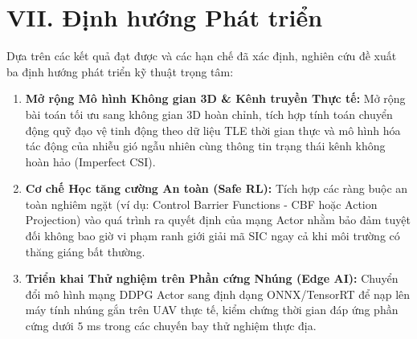 \section*{VII. Định hướng Phát triển}

Dựa trên các kết quả đạt được và các hạn chế đã xác định, nghiên cứu đề xuất ba định hướng phát triển kỹ thuật trọng tâm:
\begin{enumerate}[label=\textbf{\arabic*.}]
    \item \textbf{Mở rộng Mô hình Không gian 3D \& Kênh truyền Thực tế:} Mở rộng bài toán tối ưu sang không gian 3D hoàn chỉnh, tích hợp tính toán chuyển động quỹ đạo vệ tinh động theo dữ liệu TLE thời gian thực và mô hình hóa tác động của nhiễu gió ngẫu nhiên cùng thông tin trạng thái kênh không hoàn hảo (Imperfect CSI).
    \item \textbf{Cơ chế Học tăng cường An toàn (Safe RL):} Tích hợp các ràng buộc an toàn nghiêm ngặt (ví dụ: Control Barrier Functions - CBF hoặc Action Projection) vào quá trình ra quyết định của mạng Actor nhằm bảo đảm tuyệt đối không bao giờ vi phạm ranh giới giải mã SIC ngay cả khi môi trường có thăng giáng bất thường.
    \item \textbf{Triển khai Thử nghiệm trên Phần cứng Nhúng (Edge AI):} Chuyển đổi mô hình mạng DDPG Actor sang định dạng ONNX/TensorRT để nạp lên máy tính nhúng gắn trên UAV thực tế, kiểm chứng thời gian đáp ứng phần cứng dưới $5$ ms trong các chuyến bay thử nghiệm thực địa.
\end{enumerate}
